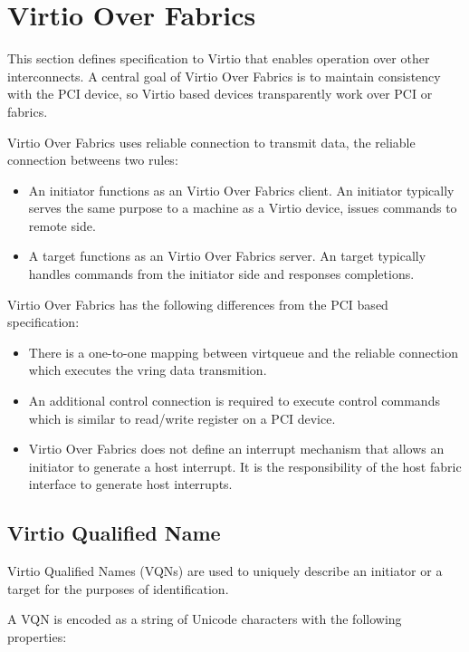 \section{Virtio Over Fabrics}\label{sec:Virtio Transport Options / Virtio Over Fabrics}

This section defines specification to Virtio that enables operation over other
interconnects. A central goal of Virtio Over Fabrics is to maintain consistency
with the PCI device, so Virtio based devices transparently work over PCI or
fabrics.

Virtio Over Fabrics uses reliable connection to transmit data, the reliable connection betweens two rules:

\begin{itemize}
\item An initiator functions as an Virtio Over Fabrics client. An initiator typically serves the same purpose to a machine as a Virtio device, issues commands to remote side.
\item A target functions as an Virtio Over Fabrics server. An target typically handles commands from the initiator side and responses completions.
\end{itemize}

Virtio Over Fabrics has the following differences from the PCI based specification:

\begin{itemize}
\item There is a one-to-one mapping between virtqueue and the reliable connection which executes the vring data transmition.
\item An additional control connection is required to execute control commands which is similar to read/write register on a PCI device.
\item Virtio Over Fabrics does not define an interrupt mechanism that allows an initiator to generate a host interrupt. It is the responsibility of the host fabric interface to generate host interrupts.
\end{itemize}

\subsection{Virtio Qualified Name}\label{sec:Virtio Transport Options / Virtio Over Fabrics / Virtio Qualified Name}
Virtio Qualified Names (VQNs) are used to uniquely describe an initiator or a target for the purposes of identification.

A VQN is encoded as a string of Unicode characters with the following properties:

